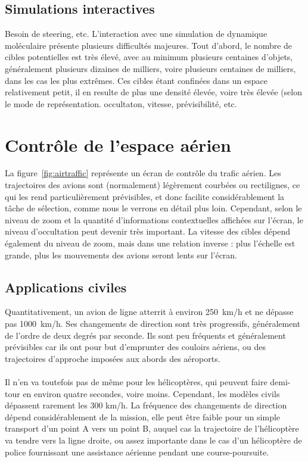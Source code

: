 	\subsection{Simulations interactives}
	Besoin de steering, etc.
	L'interaction avec une simulation de dynamique moléculaire présente plusieurs difficultés majeures. Tout d'abord, le nombre de cibles potentielles est très élevé, avec au minimum plusieurs centaines d'objets, généralement plusieurs dizaines de milliers, voire plusieurs centaines de milliers, dans les cas les plus extrêmes. Ces cibles étant confinées dans un espace relativement petit, il en resulte de plus une densité élevée, voire très élevée (selon le mode de représentation.
	 occultaton, vitesse, prévisibilité, etc.
	
	\section{Contrôle de l'espace aérien}
	La figure~\ref{fig:airtraffic} représente un écran de contrôle du trafic aérien. Les trajectoires des avions sont (normalement) légèrement courbées ou rectilignes, ce qui les rend particulièrement prévisibles, et donc facilite considérablement la tâche de sélection, comme nous le verrons en détail plus loin. Cependant, selon le niveau de zoom et la quantité d'informations contextuelles affichées sur l'écran, le niveau d'occultation peut devenir très important. La vitesse des cibles dépend également du niveau de zoom, mais dans une relation inverse : plus l'échelle est grande, plus les mouvements des avions seront lents sur l'écran.
	
	\subsection{Applications civiles}
	Quantitativement, un avion de ligne atterrit à environ 250~km/h et ne dépasse pas 1000~km/h. Ses changements de direction sont très progressifs, généralement de l'ordre de deux degrés par seconde. Ils sont peu fréquents et généralement prévisibles car ils ont pour but d'emprunter des couloirs aériens, ou des trajectoires d'approche imposées aux abords des aéroports.

	\paragraph{}
	Il n'en va toutefois pas de même pour les hélicoptères, qui peuvent faire demi-tour en environ quatre secondes, voire moins. Cependant, les modèles civils dépassent rarement les 300 km/h. La fréquence des changements de direction dépend considérablement de la mission, elle peut être faible pour un simple transport d'un point A vers un point B, auquel cas la trajectoire de l'hélicoptère va tendre vers la ligne droite, ou assez importante dans le cas d'un hélicoptère de police fournissant une assistance aérienne pendant une course-poursuite.
	
